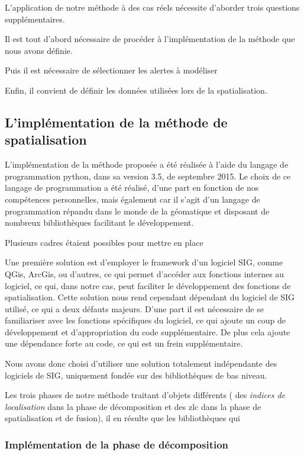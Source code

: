 L’application de notre méthode à des cas réels nécessite d'aborder
trois questions supplémentaires.

Il est tout d'abord nécessaire de procéder à l'implémentation de la
méthode que nous avons définie.

Puis il est nécessaire de sélectionner les alertes à modéliser

Enfin, il convient de définir les données utilisées lors de la
spatialisation.

\subsection{L'implémentation de la méthode de spatialisation}

L'implémentation de la méthode proposée a été réalisée à l'aide du
langage de programmation python, dans sa version 3.5, de septembre
2015. Le choix de ce langage de programmation a été réalisé, d'une
part en fonction de nos compétences personnelles, mais également car
il s'agit d'un langage de programmation répandu dans le monde de la
géomatique et disposant de nombreux bibliothèques facilitant le
développement.

Plusieurs cadres étaient possibles pour mettre en place

Une première solution est d'employer le framework d'un logiciel SIG,
comme QGis, ArcGis, ou d'autres, ce qui permet d’accéder aux fonctions
internes au logiciel, ce qui, dans notre cas, peut faciliter le
développement des fonctions de spatialisation. Cette solution nous
rend cependant dépendant du logiciel de SIG utilisé, ce qui a deux
défauts majeurs. D'une part il est nécessaire de se familiariser avec
les fonctions spécifiques du logiciel, ce qui ajoute un coup de
développement et d'appropriation du code supplémentaire. De plus cela
ajoute une dépendance forte au code, ce qui est un frein
supplémentaire.

Nous avons donc choisi d'utiliser une solution totalement indépendante
des logiciels de SIG, uniquement fondée sur des bibliothèques de bas
niveau.


Les trois phases de notre méthode traitant d'objets différents (\ie
des \emph{indices de localisation} dans la phase de décomposition et
des \ac{zlc} dans la phase de spatialisation et de fusion), il en
résulte que les bibliothèques qui 

\subsubsection{Implémentation de la phase de décomposition}

